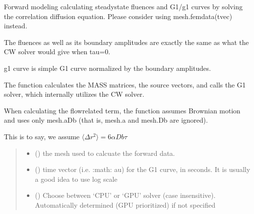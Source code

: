 \documentclass[letterpaper,10pt,english]{sphinxmanual}
\begin{document}
\begin{fulllineitems}
\label{\detokenize{_autosummary/nirfasterff.forward.femdata.femdata_DCS:nirfasterff.forward.femdata.femdata_DCS}}
\pysigstartsignatures
\pysiglinewithargsret
{}
{\sphinxparamcomma {}\sphinxparamcomma {}\sphinxparamcomma {}}
{}
\pysigstopsignatures
\sphinxAtStartPar
Forward modeling calculating steady\sphinxhyphen{}state fluences and G1/g1 curves by solving the correlation diffusion equation. Please consider using mesh.femdata(tvec) instead.

\sphinxAtStartPar
The fluences as well as its boundary amplitudes are exactly the same as what the CW solver would give when tau=0.

\sphinxAtStartPar
g1 curve is simple G1 curve normalized by the boundary amplitudes.

\sphinxAtStartPar
The function calculates the MASS matrices, the source vectors, and calls the G1 solver, which internally utilizes the CW solver.

\sphinxAtStartPar
When calculating the flow\sphinxhyphen{}related term, the function assumes Brownian motion and uses only mesh.aDb (that is, mesh.a and mesh.Db are ignored).

\sphinxAtStartPar
This is to say, we assume \(\langle\Delta r^2\rangle=6\alpha Db\tau\)
\begin{quote}\begin{description}
\begin{itemize}
\item {} 
\sphinxAtStartPar
{} () \textendash{} the mesh used to calcuate the forward data.

\item {} 
\sphinxAtStartPar
{} () \textendash{} time vector (i.e. :math:\textasciigrave{}       au\textasciigrave{}) for the G1 curve, in seconds. It is usually a good idea to use log scale

\item {} 
\sphinxAtStartPar
{} (\sphinxstyleliteralemphasis{\sphinxupquote{, }}) \textendash{} Choose between ‘CPU’ or ‘GPU’ solver (case insensitive). Automatically determined (GPU prioritized) if not specified


\end{itemize}
\end{description}
\end{quote}
\end{fulllineitems}
\end{document}
